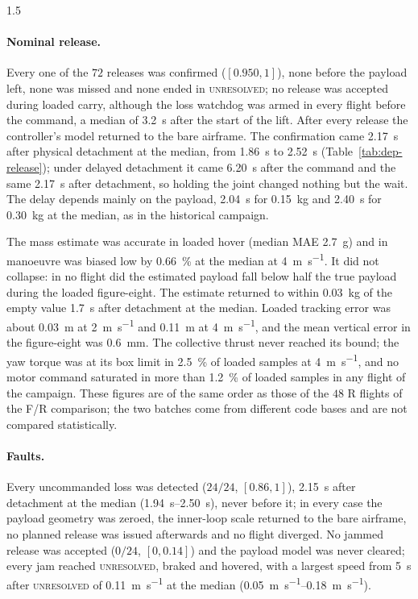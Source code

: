 \begin{spacing}{1.5}
\paragraph{Nominal release.} Every one of the $72$ releases was confirmed
($[0.950, 1]$), none before the payload left, none was missed and none ended in
\textsc{unresolved}; no release was accepted during loaded carry, although the
loss watchdog was armed in every flight before the command, a median of
\SI{3.2}{\second} after the start of the lift. After every release the
controller's model returned to the bare airframe. The confirmation came
\SI{2.17}{\second} after physical detachment at the median, from
\SI{1.86}{\second} to \SI{2.52}{\second} (Table~\ref{tab:dep-release}); under
delayed detachment it came \SI{6.20}{\second} after the command and the same
\SI{2.17}{\second} after detachment, so holding the joint changed nothing but
the wait. The delay depends mainly on the payload, \SI{2.04}{\second} for
\SI{0.15}{\kg} and \SI{2.40}{\second} for \SI{0.30}{\kg} at the median, as in
the historical campaign.

The mass estimate was accurate in loaded hover (median MAE \SI{2.7}{\gram}) and
in manoeuvre was biased low by \SI{0.66}{\percent} at the median at
\SI{4}{\meter\per\second}. It did not collapse: in no flight did the estimated
payload fall below half the true payload during the loaded figure-eight. The
estimate returned to within \SI{0.03}{\kg} of the empty value
\SI{1.7}{\second} after detachment at the median. Loaded tracking error was
about \SI{0.03}{\meter} at \SI{2}{\meter\per\second} and \SI{0.11}{\meter} at
\SI{4}{\meter\per\second}, and the mean vertical error in the figure-eight was
\SI{0.6}{\milli\meter}. The collective thrust never reached its bound; the yaw
torque was at its box limit in \SI{2.5}{\percent} of loaded samples at
\SI{4}{\meter\per\second}, and no motor command saturated in more than
\SI{1.2}{\percent} of loaded samples in any flight of the campaign. These
figures are of the same order as those of the $48$ R flights of the F/R
comparison; the two batches come from different code bases and are not compared
statistically.

\paragraph{Faults.} Every uncommanded loss was detected ($24/24$,
$[0.86, 1]$), \SI{2.15}{\second} after detachment at the median
(\SIrange{1.94}{2.50}{\second}), never before it; in every case the payload
geometry was zeroed, the inner-loop scale returned to the bare airframe, no
planned release was issued afterwards and no flight diverged. No jammed release
was accepted ($0/24$, $[0, 0.14]$) and the payload model was never cleared;
every jam reached \textsc{unresolved}, braked and hovered, with a largest speed
from \SI{5}{\second} after \textsc{unresolved} of \SI{0.11}{\meter\per\second}
at the median (\SIrange{0.05}{0.18}{\meter\per\second}).


\end{spacing}
